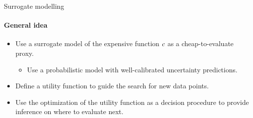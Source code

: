 \begin{frame}[c]{Surrogate modelling}
\framesubtitle{General idea}
\begin{itemize}
    \item Use a surrogate model of the expensive function $c$ as a cheap-to-evaluate proxy.
    \begin{itemize}
        \item Use a probabilistic model with well-calibrated uncertainty predictions.
    \end{itemize}
    \pause
    \item Define a utility function to guide the search for new data points.
    \pause
    \item Use the optimization of the utility function as a decision procedure to provide inference on where to evaluate next.

\end{itemize}




\end{frame}

